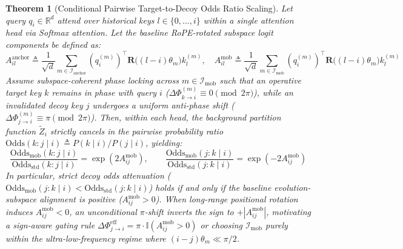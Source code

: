 \documentclass[11pt,a4paper]{article}
\newtheorem{theorem}{Theorem}
\theoremstyle{definition}
\begin{document}
\begin{theorem}[Conditional Pairwise Target-to-Decoy Odds Ratio Scaling]
\label{thm:odds_ratio}
Let query $q_i \in \mathbb{R}^d$ attend over historical keys $l \in \{0, \dots, i\}$ within a single attention head via Softmax attention. Let the baseline RoPE-rotated subspace logit components be defined as:
\begin{equation}
A_{il}^{\text{anchor}} \triangleq \frac{1}{\sqrt{d}}\sum_{m\in\mathcal{I}_{\text{anchor}}} (q_i^{(m)})^\top \mathbf{R}\big((l-i)\theta_m\big) k_l^{(m)}, \quad
A_{il}^{\text{mob}} \triangleq \frac{1}{\sqrt{d}}\sum_{m\in\mathcal{I}_{\text{mob}}} (q_i^{(m)})^\top \mathbf{R}\big((l-i)\theta_m\big) k_l^{(m)}
\end{equation}
Assume subspace-coherent phase locking across $m \in \mathcal{I}_{\text{mob}}$ such that an operative target key $k$ remains in phase with query $i$ ($\Delta\Phi_{k\to i}^{(m)} \equiv 0 \pmod{2\pi}$), while an invalidated decoy key $j$ undergoes a uniform anti-phase shift ($\Delta\Phi_{j\to i}^{(m)} \equiv \pi \pmod{2\pi}$).
Then, within each head, the background partition function $\tilde{Z}_i$ strictly cancels in the pairwise probability ratio $\mathrm{Odds}(k:j\mid i) \triangleq P(k\mid i)/P(j\mid i)$, yielding:
\begin{equation}
\frac{\mathrm{Odds}_{\mathrm{mob}}(k : j \mid i)}{\mathrm{Odds}_{\mathrm{std}}(k : j \mid i)} = \exp\!\left(2 A_{ij}^{\text{mob}}\right), \qquad
\frac{\mathrm{Odds}_{\mathrm{mob}}(j : k \mid i)}{\mathrm{Odds}_{\mathrm{std}}(j : k \mid i)} = \exp\!\left(-2 A_{ij}^{\text{mob}}\right)
\end{equation}
In particular, strict decoy odds attenuation ($\mathrm{Odds}_{\mathrm{mob}}(j:k\mid i) < \mathrm{Odds}_{\mathrm{std}}(j:k\mid i)$) holds if and only if the baseline evolution-subspace alignment is positive ($A_{ij}^{\text{mob}} > 0$). When long-range positional rotation induces $A_{ij}^{\text{mob}} < 0$, an unconditional $\pi$-shift inverts the sign to $+|A_{ij}^{\text{mob}}|$, motivating a sign-aware gating rule $\Delta\Phi_{j\to i}^{\text{eff}} = \pi \cdot \mathbb{I}(A_{ij}^{\text{mob}} > 0)$ or choosing $\mathcal{I}_{\text{mob}}$ purely within the ultra-low-frequency regime where $(i-j)\theta_m \ll \pi/2$.
\end{theorem}
\end{document}

